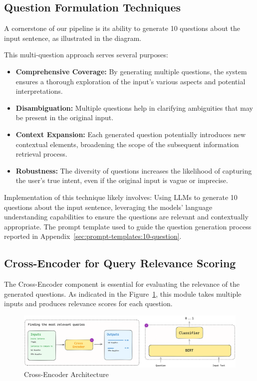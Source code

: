 \subsection{Question Formulation Techniques}\label{subsec:question-formulation-techniques}
A cornerstone of our pipeline is its ability to generate 10 questions about the input sentence, as illustrated in the diagram.

This multi-question approach serves several purposes:
\begin{itemize}
    \item \textbf{Comprehensive Coverage:} By generating multiple questions, the system ensures a thorough exploration of the input's various aspects and potential interpretations.
    \item \textbf{Disambiguation:} Multiple questions help in clarifying ambiguities that may be present in the original input.
    \item \textbf{Context Expansion:} Each generated question potentially introduces new contextual elements, broadening the scope of the subsequent information retrieval process.
    \item \textbf{Robustness:} The diversity of questions increases the likelihood of capturing the user's true intent, even if the original input is vague or imprecise.
\end{itemize}

Implementation of this technique likely involves:
Using \ac{LLMs} to generate 10 questions about the input sentence, leveraging the models' language understanding capabilities to ensure the questions are relevant and contextually appropriate.
The prompt template used to guide the question generation process reported in Appendix~\ref{sec:prompt-templates:10-question}.

\subsection{Cross-Encoder for Query Relevance Scoring}\label{subsec:cross-encoder-for-query-relevance-scoring}
The Cross-Encoder component is essential for evaluating the relevance of the generated questions.
As indicated in the Figure~\ref{fig:cross-encoder-articture}, this module takes multiple inputs and produces relevance scores for each question.

\begin{figure}[ht!]
    \centering
    \begin{minipage}[b]{\textwidth}
        \centering
        \includegraphics[width=\textwidth]{res/Cross-Encoder}
        \caption{Cross-Encoder Architecture}
        \label{fig:cross-encoder-articture}
    \end{minipage}
\end{figure}

